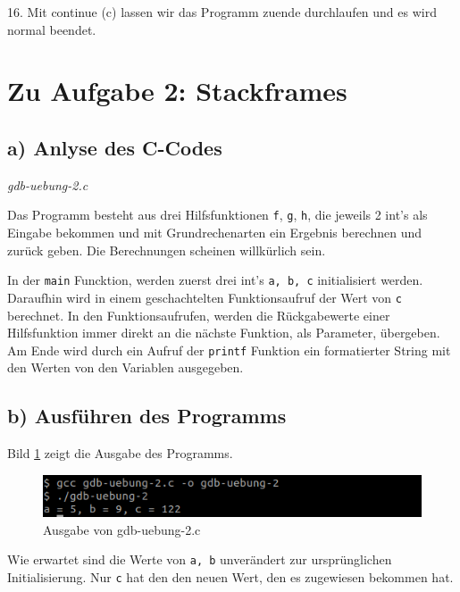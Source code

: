 \documentclass[12pt]{article}
\begin{document}

16. Mit continue (c) lassen wir das Programm zuende durchlaufen und es wird normal beendet.


\section{Zu Aufgabe 2: Stackframes}
\subsection{a) Anlyse des C-Codes}

\textit{gdb-uebung-2.c}



Das Programm besteht aus drei Hilfsfunktionen \texttt{f}, \texttt{g}, \texttt{h}, die jeweils 2 int's als Eingabe bekommen und mit Grundrechenarten ein Ergebnis berechnen und zurück geben. Die Berechnungen scheinen willkürlich sein. 

In der \texttt{main} Funcktion, werden zuerst drei int's \texttt{a, b, c} initialisiert werden. Daraufhin wird in einem geschachtelten Funktionsaufruf der Wert von \texttt{c} berechnet. In den Funktionsaufrufen, werden die Rückgabewerte einer Hilfsfunktion immer direkt an die nächste Funktion, als Parameter, übergeben. Am Ende wird durch ein Aufruf der \texttt{printf} Funktion ein formatierter String mit den Werten von den Variablen ausgegeben.


\subsection{b) Ausführen des Programms}

Bild \ref{fig:aufgabe2b} zeigt die Ausgabe des Programms.
\begin{figure}[h!]
	\includegraphics[width=\textwidth]{Pictures/a2b.png}
	\caption{Ausgabe von gdb-uebung-2.c}
	\label{fig:aufgabe2b}
\end{figure}


Wie erwartet sind die Werte von \texttt{a, b} unverändert zur ursprünglichen Initialisierung. Nur \texttt{c} hat den den neuen Wert, den es zugewiesen bekommen hat.
\end{document}
